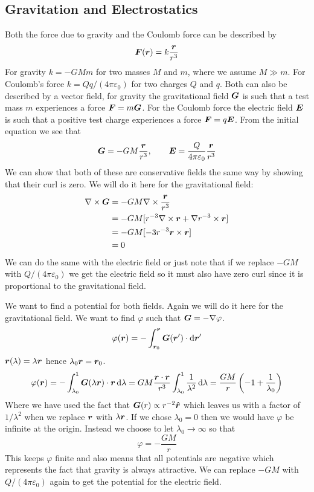 \documentclass{article}
\begin{document}
    \subsection{Gravitation and Electrostatics}
    Both the force due to gravity and the Coulomb force can be described by
    \[\bm{F}(\bm{r}) = k\frac{\bm{r}}{r^3}\]
    For gravity \(k = -GMm\) for two masses \(M\) and \(m\), where we assume \(M\gg m\).
    For Coulomb's force \(k = Qq/(4\pi\varepsilon_0)\) for two charges \(Q\) and \(q\).
    Both can also be described by a vector field, for gravity the gravitational field \(\bm{G}\) is such that a test mass \(m\) experiences a force \(\bm{F} = m\bm{G}\).
    For the Coulomb force the electric field \(\bm{E}\) is such that a positive test charge experiences a force \(\bm{F} = q\bm{E}\).
    From the initial equation we see that
    \[\bm{G} = -GM\frac{\bm{r}}{r^3},\qquad \bm{E} = \frac{Q}{4\pi\varepsilon_0}\frac{\bm{r}}{r^3}\]
    We can show that both of these are conservative fields the same way by showing that their curl is zero.
    We will do it here for the gravitational field:
    \begin{align*}
        \nabla\times\bm{G} &= -GM\nabla\times\frac{\bm{r}}{r^3}\\
        &= -GM[r^{-3}\nabla\times\bm{r} + \nabla r^{-3}\times\bm{r}]\\
        &= -GM[-3r^{-3}\bm{r}\times\bm{r}]\\
        &= 0
    \end{align*}
    We can do the same with the electric field or just note that if we replace \(-GM\) with \(Q/(4\pi\varepsilon_0)\) we get the electric field so it must also have zero curl since it is proportional to the gravitational field.
    
    We want to find a potential for both fields.
    Again we will do it here for the gravitational field.
    We want to find \(\varphi\) such that \(\bm{G} = -\nabla\varphi\).
    \[\varphi(\bm{r}) = -\int_{\bm{r}_0}^{\bm{r}}\bm{G}(\bm{r}')\cdot\dd\bm{r}'\]
    \(\bm{r}(\lambda) = \lambda\bm{r}\) hence \(\lambda_0\bm{r} = \bm{r}_0\).
    \[\varphi(\bm{r}) = -\int_{\lambda_0}^1 \bm{G}(\lambda\bm{r})\cdot\bm{r}\,\dd\lambda = GM\frac{\bm{r}\cdot\bm{r}}{r^3}\int_{\lambda_0}^1\frac{1}{\lambda^2}\,\dd\lambda = \frac{GM}{r}\left(-1 + \frac{1}{\lambda_0}\right)\]
    Where we have used the fact that \(\bm{G}(r) \propto r^{-2}\bm{\hat{r}}\) which leaves us with a factor of \(1/\lambda^2\) when we replace \(\bm{r}\) with \(\lambda\bm{r}\).
    If we chose \(\lambda_0 = 0\) then we would have \(\varphi\) be infinite at the origin.
    Instead we choose to let \(\lambda_0 \to \infty\) so that
    \[\varphi = -\frac{GM}{r}\]
    This keeps \(\varphi\) finite and also means that all potentials are negative which represents the fact that gravity is always attractive.
    We can replace \(-GM\) with \(Q/(4\pi\varepsilon_0)\) again to get the potential for the electric field.
    
\end{document}
